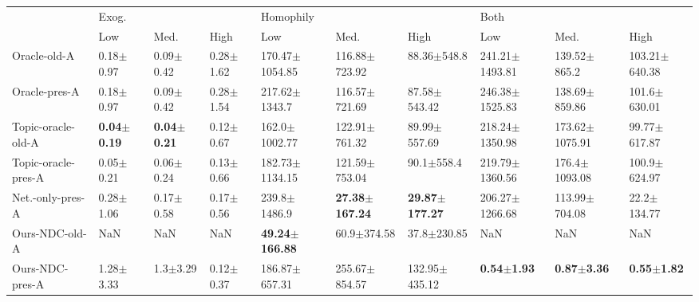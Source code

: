 \begin{tabular}{llllllllll}
\toprule
{} & \multicolumn{3}{l}{Exog.} & \multicolumn{3}{l}{Homophily} & \multicolumn{3}{l}{Both} \\
{} &                     Low &                    Med. &                    High &                        Low &                       Med. &                       High &                     Low &                    Med. &                    High \\
\midrule
Oracle-old-A        &           0.18$\pm$0.97 &           0.09$\pm$0.42 &           0.28$\pm$1.62 &         170.47$\pm$1054.85 &          116.88$\pm$723.92 &            88.36$\pm$548.8 &      241.21$\pm$1493.81 &        139.52$\pm$865.2 &       103.21$\pm$640.38 \\
Oracle-pres-A       &           0.18$\pm$0.97 &           0.09$\pm$0.42 &           0.28$\pm$1.54 &          217.62$\pm$1343.7 &          116.57$\pm$721.69 &           87.58$\pm$543.42 &      246.38$\pm$1525.83 &       138.69$\pm$859.86 &        101.6$\pm$630.01 \\
Topic-oracle-old-A  &  \textbf{0.04$\pm$0.19} &  \textbf{0.04$\pm$0.21} &           0.12$\pm$0.67 &          162.0$\pm$1002.77 &          122.91$\pm$761.32 &           89.99$\pm$557.69 &      218.24$\pm$1350.98 &      173.62$\pm$1075.91 &        99.77$\pm$617.87 \\
Topic-oracle-pres-A &           0.05$\pm$0.21 &           0.06$\pm$0.24 &           0.13$\pm$0.66 &         182.73$\pm$1134.15 &          121.59$\pm$753.04 &             90.1$\pm$558.4 &      219.79$\pm$1360.56 &       176.4$\pm$1093.08 &        100.9$\pm$624.97 \\
Net.-only-pres-A    &           0.28$\pm$1.06 &           0.17$\pm$0.58 &           0.17$\pm$0.56 &           239.8$\pm$1486.9 &  \textbf{27.38$\pm$167.24} &  \textbf{29.87$\pm$177.27} &      206.27$\pm$1266.68 &       113.99$\pm$704.08 &         22.2$\pm$134.77 \\
Ours-NDC-old-A      &                     NaN &                     NaN &                     NaN &  \textbf{49.24$\pm$166.88} &            60.9$\pm$374.58 &            37.8$\pm$230.85 &                     NaN &                     NaN &                     NaN \\
Ours-NDC-pres-A     &           1.28$\pm$3.33 &            1.3$\pm$3.29 &           0.12$\pm$0.37 &          186.87$\pm$657.31 &          255.67$\pm$854.57 &          132.95$\pm$435.12 &  \textbf{0.54$\pm$1.93} &  \textbf{0.87$\pm$3.36} &  \textbf{0.55$\pm$1.82} \\

\end{tabular}
